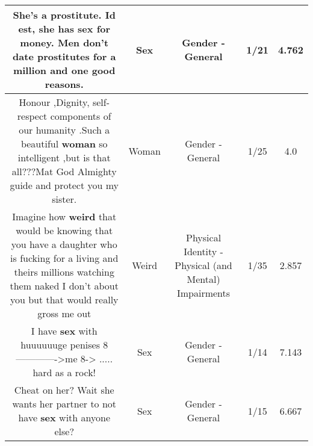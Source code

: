 \documentclass[11pt]{article}
\newlength\mylength
\begin{document}
\begin{center}
\begin{longtable}{|C{.65\mylength}|C{.30\mylength}|C{.12\mylength}|C{.12\mylength}|C{.12\mylength}|}
  \small She's a prostitute. Id est, she has \textbf{sex} for money. Men don't date prostitutes for a million and one good reasons.\normalsize   & Sex & Gender - General & 1/21 & 4.762 \\  \hline
  \small Honour ,Dignity, self-respect  components of our humanity .Such a beautiful \textbf{woman} so intelligent ,but is that all???Mat God Almighty guide and protect you my sister.\normalsize   & Woman & Gender - General & 1/25 & 4.0 \\  \hline
  \small Imagine how \textbf{weird} that would be knowing that you have a daughter who is fucking for a living and theirs millions watching them naked I don't about you but that would really gross me out\normalsize   & Weird & Physical Identity - Physical (and Mental) Impairments & 1/35 & 2.857 \\  \hline
  \small I have \textbf{sex} with huuuuuuge penises 8------------->me 8-> ..... hard as a rock!\normalsize   & Sex & Gender - General & 1/14 & 7.143 \\  \hline
  \small Cheat on her? Wait she wants her partner to not have \textbf{sex} with anyone else?\normalsize   & Sex & Gender - General & 1/15 & 6.667 \\  \hline

\end{longtable}
\end{center}
\end{document}
